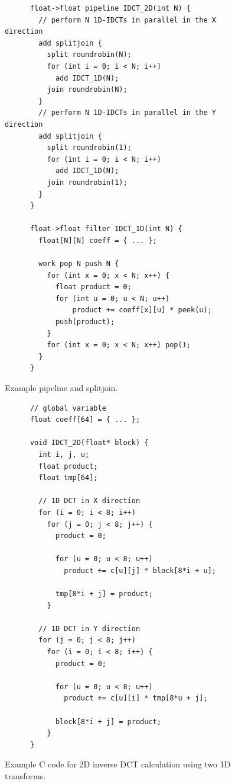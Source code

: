 \begin{figure}[t]
  \begin{scriptsize}
    \begin{verbatim}
      float->float pipeline IDCT_2D(int N) {
        // perform N 1D-IDCTs in parallel in the X direction
        add splitjoin {
          split roundrobin(N);
          for (int i = 0; i < N; i++)
            add IDCT_1D(N);
          join roundrobin(N);
        }
        // perform N 1D-IDCTs in parallel in the Y direction
        add splitjoin {
          split roundrobin(1);
          for (int i = 0; i < N; i++)
            add IDCT_1D(N);
          join roundrobin(1);
        }
      }

      float->float filter IDCT_1D(int N) {
        float[N][N] coeff = { ... };
        
        work pop N push N {
          for (int x = 0; x < N; x++) {
            float product = 0;
            for (int u = 0; u < N; u++)
                product += coeff[x][u] * peek(u);
            push(product);
          }
          for (int x = 0; x < N; x++) pop();
        }
      }
    \end{verbatim}
  \end{scriptsize}
  \vspace{-12pt}
  \caption{Example pipeline and splitjoin.}
  \label{fig:decoder-sj}
\end{figure}

\begin{figure}[t]
  \begin{scriptsize}
    \begin{verbatim}
      // global variable
      float coeff[64] = { ... };
      
      void IDCT_2D(float* block) {
        int i, j, u;
        float product;
        float tmp[64];
        
        // 1D DCT in X direction
        for (i = 0; i < 8; i++)
          for (j = 0; j < 8; j++) {
            product = 0;

            for (u = 0; u < 8; u++)
              product += c[u][j] * block[8*i + u];

            tmp[8*i + j] = product;
          }

        // 1D DCT in Y direction
        for (j = 0; j < 8; j++)
          for (i = 0; i < 8; i++) {
            product = 0;

            for (u = 0; u < 8; u++)
              product += c[u][i] * tmp[8*u + j];

            block[8*i + j] = product;
          }
      }
    \end{verbatim}
  \end{scriptsize}
  \vspace{-12pt}
  \caption{Example C code for 2D inverse DCT calculation using two 1D transforms.}
  \vspace{-16pt}
  \label{fig:idct_creference}
\end{figure}

